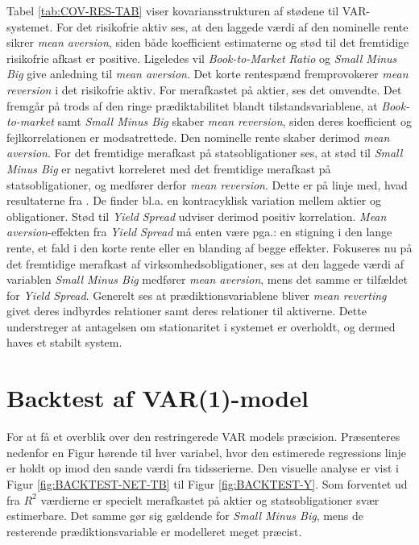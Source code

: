 \documentclass[
  a4paper,
  oneside]{memoir}
\begin{document}
Tabel \ref{tab:COV-RES-TAB} viser kovariansstrukturen af stødene til VAR-systemet. For det risikofrie aktiv ses, at den laggede værdi af den nominelle rente sikrer \emph{mean aversion}, siden både koefficient estimaterne og stød til det fremtidige risikofrie afkast er positive. Ligeledes vil \emph{Book-to-Market Ratio} og \emph{Small Minus Big} give anledning til \emph{mean aversion}. Det korte rentespænd fremprovokerer \emph{mean reversion} i det risikofrie aktiv. For merafkastet på aktier, ses det omvendte. Det fremgår på trods af den ringe prædiktabilitet blandt tilstandsvariablene, at \emph{Book-to-market} samt \emph{Small Minus Big} skaber \emph{mean reversion}, siden deres koefficient og fejlkorrelationen er modsatrettede. Den nominelle rente skaber derimod \emph{mean aversion}. For det fremtidige merafkast på statsobligationer ses, at stød til \emph{Small Minus Big} er negativt korreleret med det fremtidige merafkast på statsobligationer, og medfører derfor \emph{mean reversion}. Dette er på linje med, hvad resultaterne fra \citep{Fama1989}. De finder bl.a. en kontracyklisk variation mellem aktier og obligationer. Stød til \emph{Yield Spread} udviser derimod positiv korrelation. \emph{Mean aversion}-effekten fra \emph{Yield Spread} må enten være pga.: en stigning i den lange rente, et fald i den korte rente eller en blanding af begge effekter. Fokuseres nu på det fremtidige merafkast af virksomhedsobligationer, ses at den laggede værdi af variablen \emph{Small Minus Big} medfører \emph{mean aversion}, mens det samme er tilfældet for \emph{Yield Spread}. Generelt ses at prædiktionsvariablene bliver \emph{mean reverting} givet deres indbyrdes relationer samt deres relationer til aktiverne. Dette understreger at antagelsen om stationaritet i systemet er overholdt, og dermed haves et stabilt system.

\hypertarget{backtestvar}{%
\section{Backtest af VAR(1)-model}\label{backtestvar}}

For at få et overblik over den restringerede VAR models præcision. Præsenteres nedenfor en Figur hørende til hver variabel, hvor den estimerede regressions linje er holdt op imod den sande værdi fra tidsserierne. Den visuelle analyse er vist i Figur \ref{fig:BACKTEST-NET-TB} til Figur \ref{fig:BACKTEST-Y}. Som forventet ud fra \(R^2\) værdierne er specielt merafkastet på aktier og statsobligationer svær estimerbare. Det samme gør sig gældende for \emph{Small Minus Big}, mens de resterende prædiktionsvariable er modelleret meget præcist.
\end{document}
